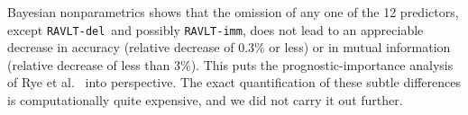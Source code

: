 \documentclass[a4paper,12pt,%
onecolumn,oneside,article,%
british%
]{memoir}
\theoremstyle{remark}
\theoremstyle{innote}
\renewcommand*{\|}[1][]{\nonscript\:#1\vert\nonscript\:\mathopen{}}
\newcommand*{\etal}{{et al.}}
\newcommand*{\ravltimm}{\texttt{RAVLT-imm}}
\newcommand*{\ravltdel}{\texttt{RAVLT-del}}
\newcommand*{\ad}{Alzheimer's Disease}
\begin{document}
Bayesian nonparametrics shows that the omission of any one of the 12 predictors, except \ravltdel\ and possibly \ravltimm, does not lead to an appreciable decrease in accuracy (relative decrease of 0.3\% or less) or in mutual information (relative decrease of less than 3\%). This puts the prognostic-importance analysis of Rye \etal\ \autocites{ryeetal2022} into perspective. The exact quantification of these subtle differences is computationally quite expensive, and we did not carry it out further.


\end{document}
